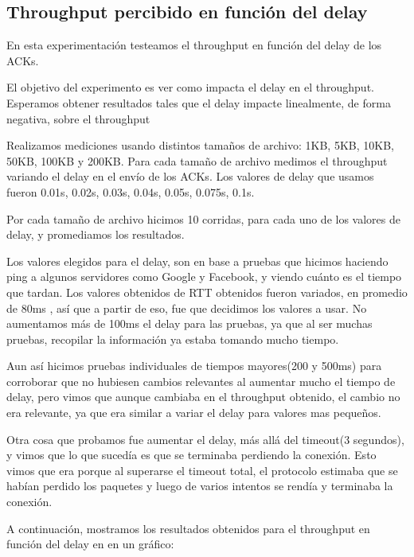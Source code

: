 \subsection{Throughput percibido en función del delay}

En esta experimentación testeamos el throughput en función del delay de los ACKs.

El objetivo del experimento es ver como impacta el delay en el throughput. Esperamos obtener resultados tales que el delay impacte linealmente, de forma negativa, sobre el throughput

Realizamos mediciones usando distintos tamaños de archivo: 1KB, 5KB, 10KB, 50KB, 100KB y 200KB. Para cada tamaño de archivo medimos el throughput variando el delay en el envío de los ACKs. Los valores de delay que usamos fueron 0.01s, 0.02s, 0.03s, 0.04s, 0.05s, 0.075s, 0.1s.

Por cada tamaño de archivo hicimos 10 corridas, para cada uno de los valores de delay, y promediamos los resultados.

Los valores elegidos para el delay, son en base a pruebas que hicimos haciendo ping a algunos servidores como Google y Facebook, y viendo cuánto es el tiempo que tardan. Los valores obtenidos de RTT obtenidos fueron variados, en promedio de 80ms , así que a partir de eso, fue que decidimos los valores a usar. No aumentamos más de 100ms el delay para las pruebas, ya que al ser muchas pruebas, recopilar la información ya estaba tomando mucho tiempo. 

Aun así hicimos pruebas individuales de tiempos mayores(200 y 500ms) para corroborar que no hubiesen cambios relevantes al aumentar mucho el tiempo de delay, pero vimos que aunque cambiaba en el throughput obtenido, el cambio no era relevante, ya que era similar a variar el delay para valores mas pequeños.

Otra cosa que probamos fue aumentar el delay, más allá del timeout(3 segundos), y vimos que lo que sucedía es que se terminaba perdiendo la conexión. Esto vimos que era porque al superarse el timeout total, el protocolo estimaba que se habían perdido los paquetes y luego de varios intentos se rendía y terminaba la conexión.

A continuación, mostramos los resultados obtenidos para el throughput en función del delay en en un gráfico:



